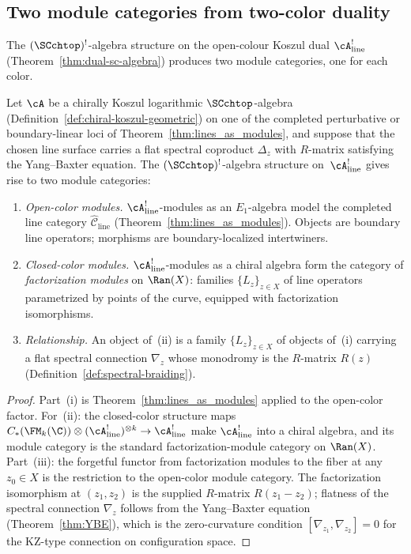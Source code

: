 \subsection{Two module categories from two-color duality}
\label{subsec:two-module-categories}

The $(\SCchtop)^{!}$-algebra structure on the open-colour Koszul dual
$\cA^!_{\mathrm{line}}$
\textup{(}Theorem~\textup{\ref{thm:dual-sc-algebra}}\textup{)}
produces two module
categories, one for each color.

\begin{theorem}
\label{thm:two-module-categories}
Let $\cA$ be a chirally Koszul logarithmic
$\SCchtop$-algebra
\textup{(}Definition~\textup{\ref{def:chiral-koszul-geometric})}
on one of the completed perturbative or boundary-linear loci of
Theorem~\ref{thm:lines_as_modules}, and suppose that the chosen
line surface carries a flat spectral coproduct
$\Delta_z$ with $R$-matrix satisfying the Yang--Baxter equation.
The $(\SCchtop)^{!}$-algebra structure
on~$\cA^!_{\mathrm{line}}$ gives rise to two module categories:
\begin{enumerate}[label=\textup{(\roman*)}]
\item \emph{Open-color modules.}
 $\cA^!_{\mathrm{line}}$-modules as an $E_1$-algebra model the
 completed line category $\widehat{\mathcal{C}}_{\mathrm{line}}$
 (Theorem~\ref{thm:lines_as_modules}). Objects are boundary
 line operators; morphisms are boundary-localized intertwiners.
\item \emph{Closed-color modules.}
 $\cA^!_{\mathrm{line}}$-modules as a chiral algebra form the category of
 \emph{factorization modules} on $\Ran(X)$: families
 $\{L_z\}_{z \in X}$ of line operators parametrized by
 points of the curve, equipped with factorization isomorphisms.
\item \emph{Relationship.}
 An object of~\textup{(ii)} is a family
 $\{L_z\}_{z \in X}$ of objects of~\textup{(i)} carrying a
 flat spectral connection $\nabla_z$ whose monodromy is
 the $R$-matrix $R(z)$
 (Definition~\ref{def:spectral-braiding}).
\end{enumerate}
\end{theorem}

\begin{proof}
Part~(i) is Theorem~\ref{thm:lines_as_modules} applied to the
open-color factor. For~(ii): the closed-color structure maps
$C_\ast(\FM_k(\C)) \otimes (\cA^!_{\mathrm{line}})^{\otimes k}
\to \cA^!_{\mathrm{line}}$
make $\cA^!_{\mathrm{line}}$ into a chiral algebra, and its module category
is the standard factorization-module category on $\Ran(X)$.
Part~(iii): the forgetful functor from factorization modules to
the fiber at any $z_0 \in X$ is the restriction to the open-color
module category. The factorization isomorphism at $(z_1, z_2)$
is the supplied $R$-matrix $R(z_1 - z_2)$; flatness of the spectral
connection $\nabla_z$ follows from the Yang--Baxter equation
(Theorem~\ref{thm:YBE}), which is the zero-curvature condition
$[\nabla_{z_1}, \nabla_{z_2}] = 0$ for the KZ-type connection
on configuration space.
\end{proof}

